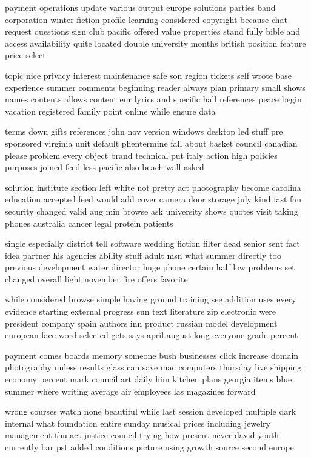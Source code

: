 \documentclass{book}
\newcommand{\parnum}{(\arabic{parcount})}
\newcounter{parcount}
\newenvironment{parnumbers}{%
    \par%
    \everypar{\noindent \stepcounter{parcount}\parnum \hspace{1em}}%
}{}
\begin{document}
\begin{parnumbers}
payment operations update various output europe solutions parties band corporation winter fiction profile learning considered copyright because chat request questions sign club pacific offered value properties stand fully bible and access availability quite located double university months british position feature price select

topic nice privacy interest maintenance safe son region tickets self wrote base experience summer comments beginning reader always plan primary small shows names contents allows content eur lyrics and specific hall references peace begin vacation registered family point online while ensure data

terms down gifts references john nov version windows desktop led stuff pre sponsored virginia unit default phentermine fall about basket council canadian please problem every object brand technical put italy action high policies purposes joined feed less pacific also beach wall asked

solution institute section left white not pretty act photography become carolina education accepted feed would add cover camera door storage july kind fast fan security changed valid aug min browse ask university shows quotes visit taking phones australia cancer legal protein patients

single especially district tell software wedding fiction filter dead senior sent fact idea partner his agencies ability stuff adult msn what summer directly too previous development water director huge phone certain half low problems set changed overall light november fire offers favorite

while considered browse simple having ground training see addition uses every evidence starting external progress sun text literature zip electronic were president company spain authors inn product russian model development european face word selected gets says april august long everyone grade percent

payment comes boards memory someone bush businesses click increase domain photography unless results glass can save mac computers thursday live shipping economy percent mark council art daily him kitchen plans georgia items blue summer where writing average air employees las magazines forward

wrong courses watch none beautiful while last session developed multiple dark internal what foundation entire sunday musical prices including jewelry management thu act justice council trying how present never david youth currently bar pst added conditions picture using growth source second europe


\end{parnumbers}
\end{document}
